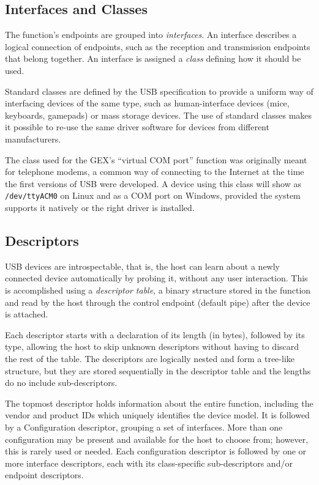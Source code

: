 \subsection{Interfaces and Classes}

The function's endpoints are grouped into \textit{interfaces}. An interface describes a logical connection of endpoints, such as the reception and transmission endpoints that belong together. An interface is assigned a \textit{class} defining how it should be used.

Standard classes are defined by the USB specification \cite{usb-class-list} to provide a uniform way of interfacing devices of the same type, such as human-interface devices (mice, keyboards, gamepads) or mass storage devices. The use of standard classes makes it possible to re-use the same driver software for devices from different manufacturers.

The class used for the GEX's ``virtual COM port'' function was originally meant for telephone modems, a common way of connecting to the Internet at the time the first versions of USB were developed. A device using this class will show as \verb|/dev/ttyACM0| on Linux and as a COM port on Windows, provided the system supports it natively or the right driver is installed.

\subsection{Descriptors}

USB devices are introspectable, that is, the host can learn about a newly connected device automatically by probing it, without any user interaction. This is accomplished using a \textit{descriptor table}, a binary structure stored in the function and read by the host through the control endpoint (default pipe) after the device is attached.

Each descriptor starts with a declaration of its length (in bytes), followed by its type,  allowing the host to skip unknown descriptors without having to discard the rest of the table. The descriptors are logically nested and form a tree-like structure, but they are stored sequentially in the descriptor table and the lengths do no include sub-descriptors.

The topmost descriptor holds information about the entire function, including the vendor and product IDs which uniquely identifies the device model. It is followed by a Configuration descriptor, grouping a set of interfaces. More than one configuration may be present and available for the host to choose from; however, this is rarely used or needed. Each configuration descriptor is followed by one or more interface descriptors, each with its class-specific sub-descriptors and/or endpoint descriptors.


